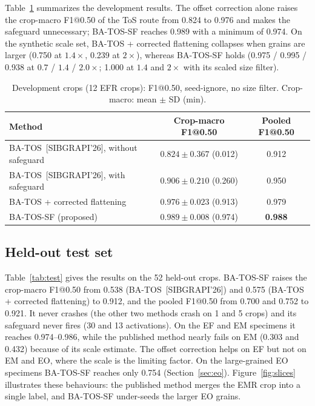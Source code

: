 \documentclass[12pt]{article}
\newcommand{\SIB}{BA-TOS~[SIBGRAPI'26]}
\newcommand{\FIX}{BA-TOS + corrected flattening}
\newcommand{\SF}{BA-TOS-SF}
\begin{document}
Table~\ref{tab:dev} summarizes the development results. The offset correction alone raises the crop-macro F1@0.50 of
the ToS route from 0.824 to 0.976 and makes the safeguard unnecessary; \SF{} reaches 0.989 with a minimum of 0.974.
On the synthetic scale set, \FIX{} collapses when grains are larger (0.750 at $1.4\times$, 0.239 at $2\times$),
whereas \SF{} holds (0.975 / 0.995 / 0.938 at $0.7$ / $1.4$ / $2.0\times$; 1.000 at $1.4$ and $2\times$ with its
scaled size filter).

\begin{table}[t]
\centering
\caption{Development crops (12 EFR crops): F1@0.50, seed-ignore, no size filter. Crop-macro: mean $\pm$ SD (min).}
\label{tab:dev}
\small
\begin{tabular}{lcc}
\toprule
Method & Crop-macro F1@0.50 & Pooled F1@0.50 \\
\midrule
\SIB, without safeguard & $0.824 \pm 0.367$ (0.012) & 0.912 \\
\SIB, with safeguard & $0.906 \pm 0.210$ (0.260) & 0.950 \\
\FIX & $0.976 \pm 0.023$ (0.913) & 0.979 \\
\SF{} (proposed) & $\mathbf{0.989 \pm 0.008}$ (0.974) & \textbf{0.988} \\
\bottomrule
\end{tabular}
\end{table}

\subsection{Held-out test set}

Table~\ref{tab:test} gives the results on the 52 held-out crops. \SF{} raises the crop-macro F1@0.50 from 0.538
(\SIB) and 0.575 (\FIX) to 0.912, and the pooled F1@0.50 from 0.700 and 0.752 to 0.921. It never crashes (the other
two methods crash on 1 and 5 crops) and its safeguard never fires (30 and 13 activations). On the EF and EM
specimens it reaches 0.974--0.986, while the published method nearly fails on EM (0.303 and 0.432) because of its
scale estimate. The offset correction helps on EF but not on EM and EO, where the scale is the limiting factor. On
the large-grained EO specimens \SF{} reaches only 0.754 (Section~\ref{sec:eo}). Figure~\ref{fig:slices}
illustrates these behaviours: the published method merges the EMR crop into a single label, and \SF{} under-seeds
the larger EO grains.
\end{document}
